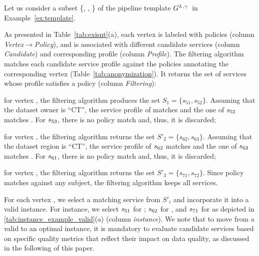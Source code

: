 \begin{example}[\bf \pipelineInstance]\label{ex:instance}

Let us consider a subset \{, , \} of the pipeline template $G^{\lambda\,,\gamma\,}$ in Example~\ref{ex:template}.

As presented in Table~\ref{tab:exisnt}(a), each vertex is labeled with policies (column \emph{Vertex$\rightarrow$Policy}), and is associated with different candidate services (column \emph{Candidate}) and corresponding profile (column \emph{Profile}). The filtering algorithm matches each candidate service profile against the policies annotating the corresponding vertex (Table~\ref{tab:anonymization}). It returns the set of services whose profile satisfies a policy (column \emph{Filtering}):
\begin{enumerate*}[label=\textit{\roman*})]
  \item for vertex , the filtering algorithm produces the set $S_{1}=\{s_{51},s_{52}\}$. Assuming that the dataset owner is ``CT'', the service profile of  matches  and the one of $s_{52}$ matches . For $s_{53}$, there is no policy match and, thus, it is discarded;
  \item for vertex , the filtering algorithm returns the set $S'_2=\{s_{62},s_{63}\}$. Assuming that the dataset region is ``CT'', the service profile of $s_{62}$ matches  and the one of $s_{63}$ matches . For $s_{61}$, there is no policy match and, thus, it is discarded;
  \item for vertex , the filtering algorithm returns the set $S'_3=\{s_{71},s_{72}\}$. Since policy  matches against any subject, the filtering algorithm keeps all services.
\end{enumerate*}

For each vertex , we select a matching service  from $S'_i$ and incorporate it into a valid instance. For instance, we select $s_{51}$ for ; $s_{62}$ for , and $s_{71}$ for  as depicted in \cref{tab:instance_example_valid}(a) (column \emph{instance}). We note that to move from a valid to an optimal instance, it is mandatory to evaluate candidate services based on specific quality metrics that reflect their impact on data quality, as discussed in the following of this paper.

\begin{table*}
  \def\arraystretch{1.5}
  \caption{Instance example}\label{tab:exisnt}

\end{table*}
\end{example}
